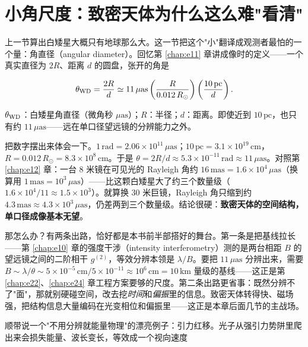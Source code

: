 \section{小角尺度：致密天体为什么这么难"看清"}
\label{sec:e18-angsize}

上一节算出白矮星大概只有地球那么大。这一节把这个"小"翻译成观测者最怕的一个量：角直径（angular diameter）。回忆第 \ref{chap:e11} 章讲成像时的定义——一个真实直径为 \(2R\)、距离 \(d\) 的圆盘，张开的角是

\begin{equation}
  \theta_{\rm WD}=\frac{2R}{d}
  \simeq 11\,\mu\mathrm{as}
  \left(\frac{R}{0.012\,R_\odot}\right)
  \left(\frac{10\,\mathrm{pc}}{d}\right).
  \label{eq:e18-theta}
\end{equation}
\begin{formulaexplain}
\(\theta_{\rm WD}\)：白矮星角直径（微角秒 \(\mu\mathrm{as}\)）；\(R\)：半径；\(d\)：距离。即使近到 \(10\,\mathrm{pc}\)，也只有约 \(11\,\mu\mathrm{as}\)——远在单口径望远镜的分辨能力之外。
\end{formulaexplain}

把数字摆出来体会一下。\(1\,\mathrm{rad}=2.06\times10^{11}\,\mu\mathrm{as}\)；\(10\,\mathrm{pc}=3.1\times10^{19}\,\mathrm{cm}\)，\(R=0.012\,R_\odot=8.3\times10^8\,\mathrm{cm}\)。于是 \(\theta=2R/d\approx5.3\times10^{-11}\,\mathrm{rad}\approx11\,\mu\mathrm{as}\)。对照第 \ref{chap:e12} 章：一台 8 米镜在可见光的 Rayleigh 角约 \(16\,\mathrm{mas}=1.6\times10^4\,\mu\mathrm{as}\)（换算用 \(1\,\mathrm{mas}=10^3\,\mu\mathrm{as}\)）——比这颗白矮星大了约三个数量级（\(1.6\times10^4/11\approx1.5\times10^3\)）。就算换 30 米巨镜，Rayleigh 角只缩到约 \(4.3\,\mathrm{mas}\approx4.3\times10^3\,\mu\mathrm{as}\)，仍差两到三个数量级。结论很硬：\textbf{致密天体的空间结构，单口径成像基本无望}。

那怎么办？有两条出路，恰好都是本书前半部搭好的舞台。第一条是把基线拉长——第 \ref{chap:e10} 章的强度干涉（intensity interferometry）测的是两台相距 \(B\) 的望远镜之间的二阶相干 \(g^{(2)}\)，等效分辨本领是 \(\lambda/B\)。要把 \(11\,\mu\mathrm{as}\) 分辨出来，需要 \(B\sim\lambda/\theta\sim5\times10^{-5}\,\mathrm{cm}/5\times10^{-11}\approx10^6\,\mathrm{cm}=10\,\mathrm{km}\) 量级的基线——这正是第 \ref{chap:e22}、\ref{chap:e24} 章工程方案要够的尺度。第二条出路更省事：既然分辨不了"面"，那就别硬碰空间，改去挖\emph{时间}和\emph{偏振}里的信息。致密天体转得快、磁场强，把结构信息大量编码在光变相位和偏振里——这正是本章后面几节的主战场。

顺带说一个"不用分辨就能量物理"的漂亮例子：引力红移。光子从强引力势阱里爬出来会损失能量、波长变长，等效成一个视向速度

